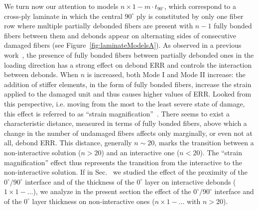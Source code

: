 \documentclass[Review,sagev,times]{sagej}
\begin{document}
We turn now our attention to models $n\times 1-m\cdot t_{90^{\circ}}$, which correspond to a cross-ply laminate in which the central $90^{\circ}$ ply is constituted by only one fiber row where multiple partially debonded fibers are present with $n-1$ fully bonded fibers between them and debonds appear on alternating sides of consecutive damaged fibers (see Figure~\ref{fig:laminateModelsA}). %
As observed in a previous work~\cite{DiStasio2019}, the presence of fully bonded fibers between partially debonded ones in the loading direction has a strong effect on debond ERR and controls the interaction between debonds. When $n$ is increased, both Mode I and Mode II increase: the addition of stiffer elements, in the form of fully bonded fibers, increase the strain applied to the damaged unit and thus causes higher values of ERR. Looked from this perspective, i.e. moving from the most to the least severe state of damage, this effect is referred to as ``strain magnification''~\cite{DiStasio2019}.  There seems to exist a characteristic distance, measured in terms of fully bonded fibers, above which a change in the number of undamaged fibers affects only marginally, or even not at all, debond ERR. This distance, generally $n\sim20$, marks the transition between a non-interactive solution ($n>20$) and an interactive one ($n<20$). The ``strain magnification'' effect thus represents the transition from the interactive to the non-interactive solution. If in Sec.~ we studied the effect of the proximity of the $0^{\circ}/90^{\circ}$ interface and of the thickness of the $0^{\circ}$ layer on interactive debonds ($1\times 1-\dots$), we analyze in the present section the effect of the $0^{\circ}/90^{\circ}$ interface and of the $0^{\circ}$ layer thickness on non-interactive ones ($n\times 1-\dots\text{ with }n>20$).\\
\end{document}
